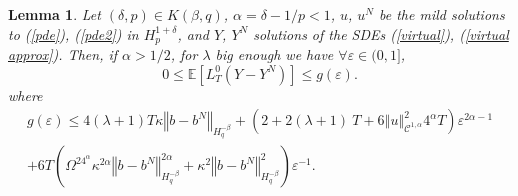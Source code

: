 \documentclass[11pt]{article}
\newtheorem{lem}[theo]{Lemma}
\newcommand{\norme}[1]{\left\Vert #1\right\Vert}
\newcommand{\E}{\mathbb{E}}
\begin{document}
\begin{lem}\label{local time}
    Let $(\delta,p)\in K(\beta,q)$, $\alpha=\delta-1/p<1$, $u$, $u^N$ be the mild solutions to (\ref{pde}), (\ref{pde2}) in $H_p^{1+\delta}$, and $Y$, $Y^N$ solutions of the SDEs (\ref{virtual}), (\ref{virtual approx}).  Then, if $\alpha>1/2$, for $\lambda$ big enough we have $\forall\varepsilon\in(0,1]$,
    \begin{equation*}
    0\leq \E\left[L^0_T(Y-Y^N)\right]\leq  g(\varepsilon).
    \end{equation*}
    where \begin{multline*}
    g(\varepsilon) \leq 4(\lambda + 1)T\kappa\norme{b-b^N}_{H^{-\beta}_{q}} + \left(2 + 2(\lambda + 1)\ T + 6\norme{u}_{\mathcal{C}^{1,\alpha}}^2 4^{\alpha}T\right) \varepsilon^{2\alpha-1} \\ + 6T\left(\Omega^24^{\alpha}\kappa^{2\alpha} \norme{b-b^N}_{H^{-\beta}_q}^{2\alpha}+\kappa^2\norme{b-b^N}_{H^{-\beta}_{q}}^2\right)\varepsilon^{-1}.
    \end{multline*}
    
\end{lem}
\end{document}
